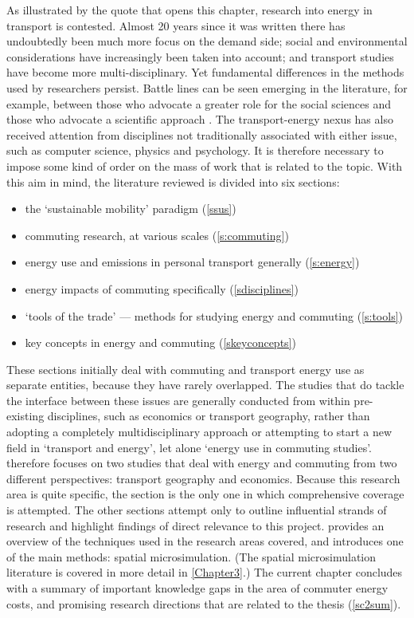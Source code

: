 \documentclass[a4paper, 11pt, twoside]{Thesis}
\begin{document}
As illustrated by the quote that opens this chapter,
research into energy in transport is
contested. Almost 20 years since it was written
there has undoubtedly been much more focus on the demand side;
social and environmental considerations have increasingly been
taken into account; and transport studies have become more
multi-disciplinary. Yet fundamental differences in the methods used by
researchers persist. Battle lines can be seen emerging in the literature,
for example, between those
who advocate a greater role for the social sciences \citep{Schwanen2011} and
those who advocate a scientific approach 
\citep{Simini2012, Marshall2008}. The transport-energy nexus has also received
attention from disciplines not traditionally associated with either issue,
such as computer science, physics and psychology.  It is therefore necessary to
impose some kind of order on the mass of work that is related to the topic.
With this aim in mind, the literature reviewed is divided into six sections:
\begin{itemize}
 \item the `sustainable mobility' paradigm (\cref{ssus})
 \item commuting research, at various scales   (\cref{s:commuting})
 \item energy use and emissions in personal transport generally (\cref{s:energy})
 \item energy impacts of commuting specifically (\cref{sdisciplines})
\item `tools of the trade' --- methods for studying energy and commuting
(\cref{s:tools})
\item key concepts in energy and commuting (\cref{skeyconcepts})
\end{itemize}
These sections initially deal with commuting and
transport energy use as separate entities,
because they have rarely overlapped. The studies that
do tackle the interface between these issues are generally conducted from
within pre-existing disciplines, such as economics or transport geography,
rather than adopting a completely multidisciplinary approach or attempting
to start a new field in `transport and energy', let alone
`energy use in commuting studies'.
 therefore focuses on two studies
that deal with energy and commuting from two different perspectives:
transport geography and economics.
Because this
research area is quite specific, the section is the only one in which
comprehensive coverage is attempted. The other sections attempt
only to outline influential strands of research and highlight findings
of direct relevance to this project.  provides
an overview of the techniques used in the research areas covered, and introduces
one of the main methods: spatial microsimulation.
(The spatial microsimulation literature is covered in more detail in
\cref{Chapter3}.)
The current chapter
concludes with a summary of important knowledge gaps in the area of
commuter energy costs, and promising research directions that
are related to the thesis (\cref{sc2sum}).
\end{document}
